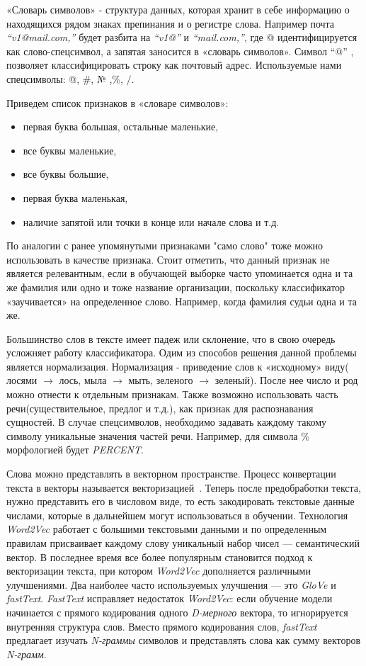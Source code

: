 \documentclass{csmathnotes}
\begin{document}
«Словарь символов» - структура данных, которая хранит в себе информацию о находящихся рядом знаках препинания и о регистре слова. Например почта \emph{“v1@mail.com,”} будет разбита на \emph{“v1@”} и \emph{“mail.com,”}, где @ идентифицируется как слово-спецсимвол, а запятая заносится в «словарь символов». Символ “@” , позволяет классифицировать строку как почтовый адрес. Используемые нами спецсимволы: @, \#, № ,\%, $/$.


Приведем список признаков в «словаре символов»:
\begin{itemize}
    \item первая буква большая, остальные маленькие,
    \item все буквы маленькие,
    \item все буквы большие,
    \item первая буква маленькая,
    \item наличие запятой или точки в конце или начале слова и т.д.
\end{itemize}


По аналогии с ранее упомянутыми признаками "само слово" тоже можно использовать в качестве признака. Стоит отметить, что данный признак не является релевантным, если в обучающей выборке часто упоминается одна и та же фамилия или одно и тоже название организации, поскольку классификатор «заучивается» на определенное слово. Например, когда фамилия судьи одна и та же.


Большинство слов в тексте имеет падеж или склонение, что в свою очередь усложняет работу классификатора. Одим из способов решения данной проблемы является нормализация. Нормализация - приведение слов к «исходному» виду( лосями $\rightarrow$  лось, мыла $\rightarrow$ мыть, зеленого $\rightarrow$ зеленый). После нее число и род  можно отнести к отдельным признакам. Также возможно использовать часть речи(существительное, предлог и т.д.), как признак для распознавания сущностей. В случае спецсимволов, необходимо задавать каждому такому символу уникальные значения частей речи. Например, для символа \% морфологией будет \emph{PERCENT}.

 
Слова можно представлять в векторном пространстве. Процесс конвертации текста в векторы называется векторизацией~\cite{w2v}. Теперь после предобработки текста, нужно представить его в числовом виде, то есть закодировать текстовые данные числами, которые в дальнейшем могут использоваться в обучении. Технология \emph{Word2Vec} работает с большими текстовыми данными и по определенным правилам присваивает каждому слову уникальный набор чисел — семантический вектор. В последнее время все более популярным становится подход к векторизации текста, при котором \emph{Word2Vec} дополняется различными улучшениями. Два наиболее часто используемых улучшения — это \emph{GloVe} и \emph{fastText}. \emph{FastText} исправляет недостаток \emph{Word2Vec}: если обучение модели начинается с прямого кодирования одного \emph{D-мерного} вектора, то игнорируется внутренняя структура слов. Вместо прямого кодирования слов, \emph{fastText} предлагает изучать \emph{N-граммы} символов и представлять слова как сумму векторов \emph{N-грамм}.
\end{document}
